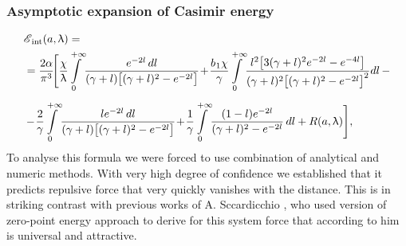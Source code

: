\documentclass[10pt,t]{beamer}
\begin{document}
\begin{frame}
  \frametitle{Asymptotic expansion of Casimir energy}

  \vspace{-2em}


  \begin{equation}
    \label{eq:Rescaled-version-of-the-model-05}
    \begin{split}
      &\EInt( a, \lambda ) = \\
      &=
        \frac{ 2 \alpha }{ \pi^{ 3 } } \! \Bigg[ \frac{ \chi }{ \lambda } \!
        \int\limits_{ 0 }^{ +\infty } \!
        \frac{ e^{ -2 l } \, dl }{ ( \gamma + l )
        \big[ ( \gamma + l )^{ 2 } - e^{ -2 l } \big] } \! + \!
        \frac{ b_{ \HorSpaceOne 1 } \chi }{ \gamma } \!
        \int\limits_{ 0 }^{ +\infty } \!
        \frac{ l^{ 2 } \big[ 3 ( \gamma + l )^{ 2 } e^{ -2 l } -
        e^{ -4 l } \big] }
        { ( \gamma + l )^{ 2 }
        \big[ ( \gamma + l )^{ 2 } - e^{ -2 l } \big]^{ 2 } } dl
        \, - \\[0.5em]
      &- \! \frac{ 2 }{ \gamma } \! \int\limits_{ 0 }^{ +\infty } \!
        \frac{ l e^{ -2 l }\, dl }{ ( \gamma + l )
        \big[ ( \gamma + l )^{ 2 } - e^{ -2 l } \big] } \! + \!
        \frac{ 1 }{ \gamma } \!
        \int\limits_{ 0 }^{ +\infty } \! \frac{ ( 1 - l ) e^{ -2 l } }{
        ( \gamma + l )^{ 2 } - e^{ -2 l } } \, dl + R( a, \lambda ) \Bigg],
    \end{split}
  \end{equation}
  To analyse this formula we were forced to use combination of analytical
  and numeric methods. With very high degree of confidence we established
  that it predicts repulsive force that very quickly vanishes with the
  distance. This is in striking contrast with previous works of A.
  Sccardicchio \parencite{Scardicchio-Casimir-dynamics-ETC-2005}, who used
  version of zero-point energy approach to derive for this system force
  that according to him is \alert{universal} and \alert{attractive}.



\end{frame}
\end{document}
